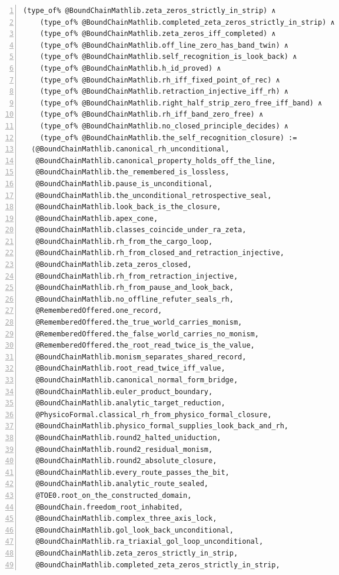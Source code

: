 \documentclass[10pt]{article}
\newcommand{\leansize}{\fontsize{5.5pt}{6.75pt}\selectfont}
\begin{document}
\begin{multicols}{2}
\begin{Verbatim}[numbers=left,firstnumber=1,numbersep=3pt,xleftmargin=2.6em,breaklines=true,breakanywhere=true,breakautoindent=false,breakindent=1.4em,breaksymbolleft={},breakanywheresymbolpre={},fontsize=\leansize]
    (type_of% @BoundChainMathlib.zeta_zeros_strictly_in_strip) ∧
    (type_of% @BoundChainMathlib.completed_zeta_zeros_strictly_in_strip) ∧
    (type_of% @BoundChainMathlib.zeta_zeros_iff_completed) ∧
    (type_of% @BoundChainMathlib.off_line_zero_has_band_twin) ∧
    (type_of% @BoundChainMathlib.self_recognition_is_look_back) ∧
    (type_of% @BoundChainMathlib.h_id_proved) ∧
    (type_of% @BoundChainMathlib.rh_iff_fixed_point_of_rec) ∧
    (type_of% @BoundChainMathlib.retraction_injective_iff_rh) ∧
    (type_of% @BoundChainMathlib.right_half_strip_zero_free_iff_band) ∧
    (type_of% @BoundChainMathlib.rh_iff_band_zero_free) ∧
    (type_of% @BoundChainMathlib.no_closed_principle_decides) ∧
    (type_of% @BoundChainMathlib.the_self_recognition_closure) :=
  ⟨@BoundChainMathlib.canonical_rh_unconditional,
   @BoundChainMathlib.canonical_property_holds_off_the_line,
   @BoundChainMathlib.the_remembered_is_lossless,
   @BoundChainMathlib.pause_is_unconditional,
   @BoundChainMathlib.the_unconditional_retrospective_seal,
   @BoundChainMathlib.look_back_is_the_closure,
   @BoundChainMathlib.apex_cone,
   @BoundChainMathlib.classes_coincide_under_ra_zeta,
   @BoundChainMathlib.rh_from_the_cargo_loop,
   @BoundChainMathlib.rh_from_closed_and_retraction_injective,
   @BoundChainMathlib.zeta_zeros_closed,
   @BoundChainMathlib.rh_from_retraction_injective,
   @BoundChainMathlib.rh_from_pause_and_look_back,
   @BoundChainMathlib.no_offline_refuter_seals_rh,
   @RememberedOffered.one_record,
   @RememberedOffered.the_true_world_carries_monism,
   @RememberedOffered.the_false_world_carries_no_monism,
   @RememberedOffered.the_root_read_twice_is_the_value,
   @BoundChainMathlib.monism_separates_shared_record,
   @BoundChainMathlib.root_read_twice_iff_value,
   @BoundChainMathlib.canonical_normal_form_bridge,
   @BoundChainMathlib.euler_product_boundary,
   @BoundChainMathlib.analytic_target_reduction,
   @PhysicoFormal.classical_rh_from_physico_formal_closure,
   @BoundChainMathlib.physico_formal_supplies_look_back_and_rh,
   @BoundChainMathlib.round2_halted_uniduction,
   @BoundChainMathlib.round2_residual_monism,
   @BoundChainMathlib.round2_absolute_closure,
   @BoundChainMathlib.every_route_passes_the_bit,
   @BoundChainMathlib.analytic_route_sealed,
   @TOE0.root_on_the_constructed_domain,
   @BoundChain.freedom_root_inhabited,
   @BoundChainMathlib.complex_three_axis_lock,
   @BoundChainMathlib.gol_look_back_unconditional,
   @BoundChainMathlib.ra_triaxial_gol_loop_unconditional,
   @BoundChainMathlib.zeta_zeros_strictly_in_strip,
   @BoundChainMathlib.completed_zeta_zeros_strictly_in_strip,

\end{Verbatim}
\end{multicols}
\end{document}
